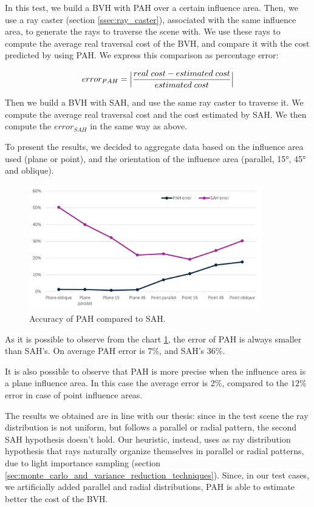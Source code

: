 \documentclass{PoliMi_MasterThesis}
\begin{document}
In this test, we build a BVH with PAH over a certain influence area. Then, we use a ray caster (section \ref{ssec:ray_caster}), associated with the same influence area, to generate the rays to traverse the scene with. We use these rays to compute the average real traversal cost of the BVH, and compare it with the cost predicted by using PAH. We express this comparison as percentage error:

$$error_{PAH} = \Big{|}\frac{real \; cost - estimated \; cost}{estimated \; cost}\Big{|}$$

Then we build a BVH with SAH, and use the same ray caster to traverse it. We compute the average real traversal cost and the cost estimated by SAH. We then compute the $error_{SAH}$ in the same way as above.

To present the results, we decided to aggregate data based on the influence area used (plane or point), and the orientation of the influence area (parallel, 15°, 45° and oblique).

\begin{figure}[H]
	\centering
	\includegraphics[width=0.9\textwidth]{Images/pah_accuracy_chart.png}
	\caption{Accuracy of PAH compared to SAH.} 
	\label{fig:pah_accuracy_chart}
\end{figure}

As it is possible to observe from the chart \ref{fig:pah_accuracy_chart}, the error of PAH is always smaller than SAH's. On average PAH error is $7\%$, and SAH's $36\%$.

It is also possible to observe that PAH is more precise when the influence area is a plane influence area. In this case the average error is $2\%$, compared to the $12\%$ error in case of point influence areas.

The results we obtained are in line with our thesis: since in the test scene the ray distribution is not uniform, but follows a parallel or radial pattern, the second SAH hypothesis doesn't hold. Our heuristic, instead, uses as ray distribution hypothesis that rays naturally organize themselves in parallel or radial patterns, due to light importance sampling (section \ref{sec:monte_carlo_and_variance_reduction_techniques}). Since, in our test cases, we artificially added parallel and radial distributions, PAH is able to estimate better the cost of the BVH.
\end{document}
